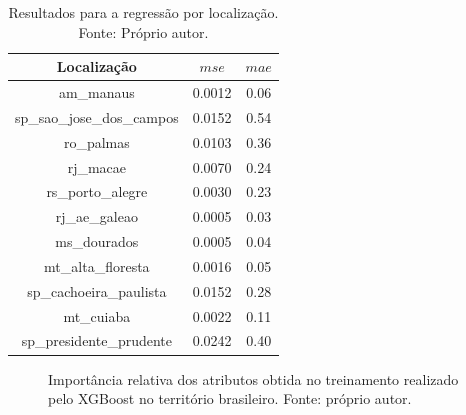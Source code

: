 \begin{table}[H]
\begin{center}
\begin{tabular}{|c|c|c|}
\hline
Localização & $mse$ & $mae$ \\ \hline
am\_manaus               & 0.0012 & 0.06 \\ \hline
sp\_sao\_jose\_dos\_campos  & 0.0152 & 0.54 \\ \hline
ro\_palmas               & 0.0103 & 0.36 \\ \hline
rj\_macae                & 0.0070 & 0.24 \\ \hline
rs\_porto\_alegre         & 0.0030 & 0.23 \\ \hline
rj\_ae\_galeao            & 0.0005 & 0.03 \\ \hline
ms\_dourados             & 0.0005 & 0.04 \\ \hline
mt\_alta\_floresta        & 0.0016 & 0.05 \\ \hline
sp\_cachoeira\_paulista   & 0.0152 & 0.28 \\ \hline
mt\_cuiaba               & 0.0022 & 0.11 \\ \hline
sp\_presidente\_prudente  & 0.0242 & 0.40 \\ \hline
\end{tabular}
\end{center}
\vspace{12pt}
\caption{Resultados para a regressão por localização. Fonte: Próprio autor.}
\label{tab:results_some_reg}
\end{table}


\begin{figure}[H]
\center
{}
\caption{Importância relativa dos atributos obtida no treinamento realizado pelo XGBoost no território brasileiro. Fonte: próprio autor.}\label{fig:regall}
\end{figure}

